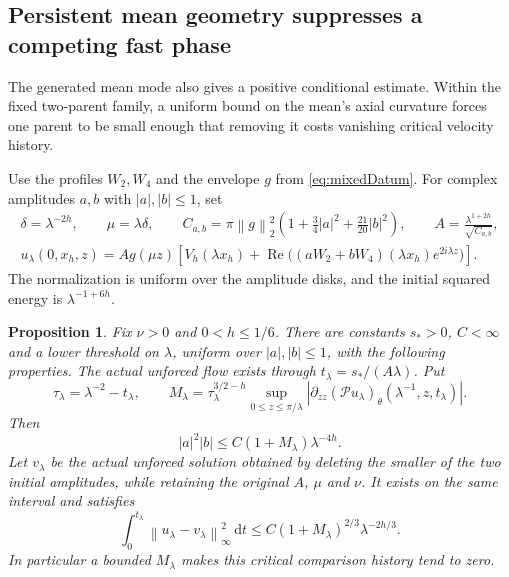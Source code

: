 \documentclass[11pt]{article}
\newtheorem{proposition}[theorem]{Proposition}
\theoremstyle{remark}
\newcommand{\PP}{\mathcal P}
\newcommand{\dd}{\,\mathrm d}
\newcommand{\norm}[1]{\left\lVert#1\right\rVert}
\begin{document}
\subsection{Persistent mean geometry suppresses a competing fast phase}

The generated mean mode also gives a positive conditional estimate.
Within the fixed two-parent family, a uniform bound on the mean's
axial curvature forces one parent to be small enough that removing it
costs vanishing critical velocity history.

Use the profiles $W_2,W_4$ and the envelope $g$ from
\eqref{eq:mixedDatum}. For complex amplitudes $a,b$ with
$|a|,|b|\leq1$, set
\begin{gather*}
 \delta=\lambda^{-2h},\qquad \mu=\lambda\delta,\qquad
 C_{a,b}=\pi\norm g_2^2
             \left(1+\frac34|a|^2+\frac{21}{20}|b|^2\right),
 \qquad A=\frac{\lambda^{1+2h}}{\sqrt{C_{a,b}}},\\
 u_\lambda(0,x_h,z)=A g(\mu z)
   \left[V_h(\lambda x_h)+\operatorname{Re}
          \big((aW_2+bW_4)(\lambda x_h)e^{2i\lambda z}\big)\right].
\end{gather*}
The normalization is uniform over the amplitude disks, and the initial
squared energy is $\lambda^{-1+6h}$.

\begin{proposition}\label{prop:geometryPhaseReduction}
Fix $\nu>0$ and $0<h\leq1/6$. There are constants $s_*>0$, $C<\infty$
and a lower threshold on $\lambda$, uniform over $|a|,|b|\leq1$,
with the following properties. The actual unforced flow exists through
$t_\lambda=s_*/(A\lambda)$. Put
\[
 \tau_\lambda=\lambda^{-2}-t_\lambda,\qquad
 M_\lambda=\tau_\lambda^{3/2-h}
       \sup_{0\leq z\leq\pi/\lambda}
       \left|\partial_{zz}(\PP u_\lambda)_\theta
                       (\lambda^{-1},z,t_\lambda)\right|.
\]
Then
\begin{equation}\label{eq:phaseProductBound}
 |a|^2|b|\leq C(1+M_\lambda)\lambda^{-4h}.
\end{equation}
Let $v_\lambda$ be the actual unforced solution obtained by deleting
the smaller of the two initial amplitudes, while retaining the original
$A$, $\mu$ and $\nu$. It exists on the same interval and satisfies
\begin{equation}\label{eq:onePhaseHistory}
 \int_0^{t_\lambda}\norm{u_\lambda-v_\lambda}_\infty^2\dd t
       \leq C(1+M_\lambda)^{2/3}\lambda^{-2h/3}.
\end{equation}
In particular a bounded $M_\lambda$ makes this critical comparison
history tend to zero.
\end{proposition}
\end{document}
